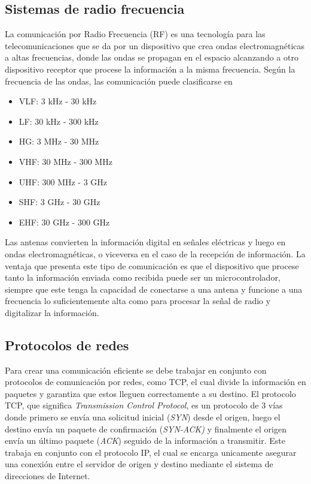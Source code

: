 \subsection*{Sistemas de radio frecuencia}
La comunicación por Radio Frecuencia (RF) es una tecnología para las telecomunicaciones que se da por un dispositivo que crea ondas electromagnéticas a altas frecuencias, donde las ondas se propagan en el espacio alcanzando a otro dispositivo receptor que procese la información a la misma frecuencia. Según la frecuencia de las ondas, las comunicación puede clasificarse en \begin{itemize}
    \item VLF: 3 kHz - 30 kHz
    \item LF: 30 kHz - 300 kHz
    \item HG: 3 MHz - 30 MHz
    \item VHF: 30 MHz - 300 MHz
    \item UHF: 300 MHz - 3 GHz
    \item SHF: 3 GHz - 30 GHz
    \item EHF: 30 GHz - 300 GHz
\end{itemize}
Las antenas convierten la información digital en señales eléctricas y luego en ondas electromagnéticas, o viceversa en el caso de la recepción de información. La ventaja que presenta este tipo de comunicación es que el dispositivo que procese tanto la información enviada como recibida puede ser un microcontrolador, siempre que este tenga la capacidad de conectarse a una antena y funcione a una frecuencia lo suficientemente alta como para procesar la señal de radio y digitalizar la información.

\subsection*{Protocolos de redes}
Para crear una comunicación eficiente se debe trabajar en conjunto con protocolos de comunicación por redes, como TCP, el cual divide la información en paquetes y garantiza que estos lleguen correctamente a su destino. El protocolo TCP, que significa \emph{Transmission Control Protocol}, es un protocolo de 3 vías donde primero se envía una solicitud inicial (\emph{SYN}) desde el origen, luego el destino envía un paquete de confirmación (\emph{SYN-ACK)} y finalmente el origen envía un último paquete (\emph{ACK}) seguido de la información a transmitir. Este trabaja en conjunto con el protocolo IP, el cual se encarga unicamente asegurar una conexión entre el servidor de origen y destino mediante el sistema de direcciones de Internet.

